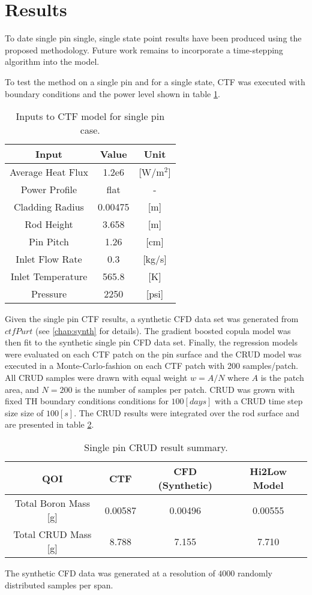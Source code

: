\section{Results}

To date single pin single, single state point results have been produced using the proposed methodology.  Future work remains to incorporate a time-stepping algorithm into the model. 

To test the method on a single pin and for a single state, CTF was executed with boundary conditions and the power level shown in table \ref{tab:ctf_inputs}.  

\begin{table}[h!]
\begin{center}
\begin{tabular}{|c|c|c|}
\hline 
Input	& Value	& Unit	\\ \hline
Average Heat Flux	& 1.2e6	& [W/$\mathrm m^2$]	\\
Power Profile	& flat	& -	\\
Cladding Radius	& 0.00475	&[m]	\\
Rod Height	&3.658	&[m]	\\
Pin Pitch  & 1.26   & [cm]  \\
Inlet Flow Rate	& 0.3	&[kg/s]	\\
Inlet Temperature	&565.8	&[K]	\\
Pressure	&2250	&[psi]	\\
\hline
\end{tabular}
\caption{Inputs to CTF model for single pin case.}
\label{tab:ctf_inputs}
\end{center}
\end{table}

Given the single pin CTF results, a synthetic CFD data set was generated  from $ctfPurt$ (see \autoref{chap:synth} for details).
The gradient boosted copula model was then fit to the synthetic single pin CFD data set.  Finally, the regression models were evaluated on each CTF patch on the pin surface and the CRUD model was executed in a Monte-Carlo-fashion on each CTF patch with 200 samples/patch. All CRUD samples were drawn with equal weight $w =A/N$ where $A$ is the patch area, and $N=200$ is the number of samples per patch.  CRUD was grown with fixed TH boundary conditions conditions for $100[days]$ with a CRUD time step size size of $100[s]$. The CRUD results were integrated over the rod surface and are presented in table \ref{tab:crud_res}.

\begin{table}[h!]
\begin{center}
\begin{tabular}{|c|c|c|c|}
\hline 
 QOI  &   CTF	&  CFD (Synthetic)	& Hi2Low Model \\ \hline
Total Boron Mass [g]& 0.00587	&  0.00496	& 0.00555 \\
Total CRUD Mass [g]	& 8.788	&  7.155 & 7.710	\\
\hline
\end{tabular}
\caption{Single pin CRUD result summary.}
\label{tab:crud_res}
\end{center}
\end{table}
The synthetic CFD data was generated at a resolution of $4000$ randomly distributed samples per span.

